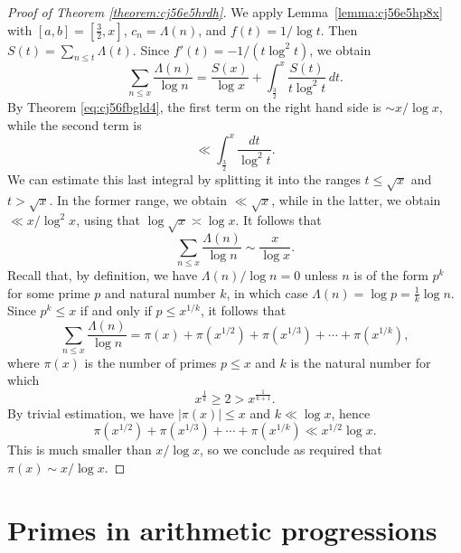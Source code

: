 \documentclass[reqno]{amsart}  \numberwithin{theorem}{section} \numberwithin{equation}{section}
\begin{document}
\begin{proof}[Proof of Theorem \ref{theorem:cj56e5hrdh}]
  We apply Lemma~\ref{lemma:cj56e5hp8x} with $[a,b] = [\tfrac{3}{2},x]$, $c_n = \Lambda(n)$, and $f(t) = 1 / \log t$.  Then $S(t) = \sum_{n \leq t} \Lambda(t)$.  Since $f'(t) = - 1 / (t \log^2 t)$, we obtain
  \begin{equation*}
    \sum_{n \leq x} \frac{\Lambda(n)}{\log n}
    = \frac{S(x)}{\log x} + \int_{\frac{3}{2}}^{x} \frac{S(t)}{t \log^2 t} \, d t.
  \end{equation*}
  By Theorem \eqref{eq:cj56fbgld4}, the first term on the right hand side is $\sim x / \log x$, while the second term is
  \begin{equation*}
    \ll \int_{\frac{3}{2}}^x \frac{d t}{\log ^2 t}.
  \end{equation*}
  We can estimate this last integral by splitting it into the ranges $t \leq \sqrt{x}$ and $t > \sqrt{x}$.  In the former range, we obtain $\ll \sqrt{x}$, while in the latter, we obtain $\ll x / \log ^2 x$, using that $\log \sqrt{x} \asymp \log x$.  It follows that
  \begin{equation*}
    \sum_{n \leq x}  \frac{\Lambda (n)}{\log n}
    \sim \frac{x}{\log x}.
  \end{equation*}
  Recall that, by definition, we have $\Lambda (n) / \log n = 0$ unless $n$ is of the form $p^k $ for some prime $p$ and natural number $k$, in which case $\Lambda (n) = \log p = \tfrac{1}{k} \log n$.  Since $p^k \leq x$ if and only if $p \leq x^{1/k}$, it follows that
  \begin{equation*}
    \sum_{n \leq x}  \frac{\Lambda (n)}{\log n}
    = \pi (x) + \pi (x^{1/2} ) + \pi (x^{1/3} ) + \dotsb + \pi (x^{1 / k}),
  \end{equation*}
  where $\pi(x)$ is the number of primes $p \leq x$ and $k$ is the natural number for which
  \begin{equation*}
    x^{\frac{1}{k}} \geq 2 > x^{\frac{1}{k + 1}}.
  \end{equation*}
  By trivial estimation, we have $\left\lvert \pi(x) \right\rvert \leq x$ and $k \ll \log x$, hence
  \begin{equation*}
    \pi (x^{1/2} ) + \pi (x^{1/3} ) + \dotsb + \pi (x^{1/k}) \ll x^{1/2} \log x.
  \end{equation*}
  This is much smaller than $x / \log x$, so we conclude as required that $\pi (x) \sim x / \log x$.
\end{proof}

\section{Primes in arithmetic progressions}
\end{document}
